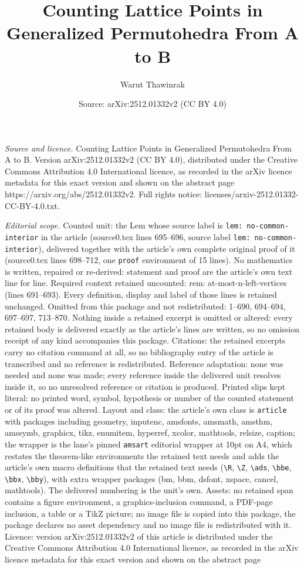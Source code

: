\documentclass[10pt,a4paper]{amsart}
\title[Counting Lattice Points in Generalized Permutohedra From A t]{Counting Lattice Points in Generalized Permutohedra From A to B}
\author{Warut Thawinrak}
\date{Source: arXiv:2512.01332v2 (CC BY 4.0)}
\begin{document}
\maketitle

\noindent\emph{Source and licence.} Counting Lattice Points in Generalized Permutohedra From A to B. Version arXiv:2512.01332v2 (CC BY 4.0), distributed under the Creative Commons Attribution 4.0 International licence, as recorded in the arXiv licence metadata for this exact version and shown on the abstract page https://arxiv.org/abs/2512.01332v2. Full rights notice: licenses/arxiv-2512.01332-CC-BY-4.0.txt.\par\smallskip

\noindent\textit{Editorial scope.} Counted unit: the Lem whose source label is \texttt{lem: no-common-interior} in the article (source0.tex lines 695--696, source label \texttt{lem: no-common-interior}), delivered together with the article's own complete original proof of it (source0.tex lines 698--712, one \texttt{proof} environment of 15 lines). No mathematics is written, repaired or re-derived: statement and proof are the article's own text line for line. Required context retained uncounted: rem: at-most-n-left-vertices (lines 691--693). Every definition, display and label of those lines is retained unchanged. Omitted from this package and not redistributed: 1--690, 694--694, 697--697, 713--870. Nothing inside a retained excerpt is omitted or altered: every retained body is delivered exactly as the article's lines are written, so no omission receipt of any kind accompanies this package. Citations: the retained excerpts carry no citation command at all, so no bibliography entry of the article is transcribed and no reference is redistributed. Reference adaptation: none was needed and none was made; every reference inside the delivered unit resolves inside it, so no unresolved reference or citation is produced. Printed slips kept literal: no printed word, symbol, hypothesis or number of the counted statement or of its proof was altered. Layout and class: the article's own class is \texttt{article} with packages including geometry, inputenc, amsfonts, amsmath, amsthm, amssymb, graphicx, tikz, enumitem, hyperref, xcolor, mathtools, relsize, caption; the wrapper is the lane's pinned \texttt{amsart} editorial wrapper at 10pt on A4, which restates the theorem-like environments the retained text needs and adds the article's own macro definitions that the retained text needs (\texttt{\textbackslash R}, \texttt{\textbackslash Z}, \texttt{\textbackslash ads}, \texttt{\textbackslash bbe}, \texttt{\textbackslash bbx}, \texttt{\textbackslash bby}), with extra wrapper packages (bm, bbm, dsfont, xspace, cancel, mathtools). The delivered numbering is the unit's own. Assets: no retained span contains a figure environment, a graphics-inclusion command, a PDF-page inclusion, a table or a TikZ picture; no image file is copied into this package, the package declares no asset dependency and no image file is redistributed with it. Licence: version arXiv:2512.01332v2 of this article is distributed under the Creative Commons Attribution 4.0 International licence, as recorded in the arXiv licence metadata for this exact version and shown on the abstract page 
\end{document}
